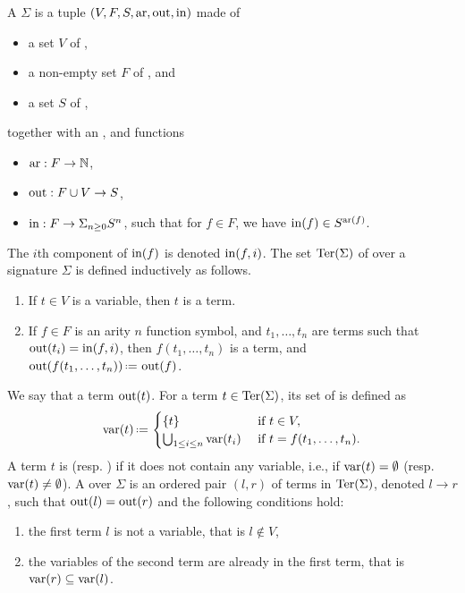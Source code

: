 A  $\Sigma$ is a tuple $(V,F,S,\mathrm{ar},\operatorname{out},\operatorname{in})$ made of 
\begin{itemize}
  \item a set $V$ of ,
  \item a non-empty set $F$ of , and
  \item a set $S$ of ,
\end{itemize}
together with an ,  and  functions
\begin{itemize}
  \item $\mathrm{ar} : F \to \mathbb{N}$,
  \item $\operatorname{out} : F \cup V \to S$,
  \item $\operatorname{in} : F \to \Sigma_{n \geq 0} S^{n}$, such that for $f \in F$, we have $\operatorname{in}(f) \in S^{\mathrm{ar}(f)}$. 
\end{itemize}
The $i$th component of $\operatorname{in}(f)$ is denoted $\operatorname{in}(f,i)$.
The set $\operatorname{Ter}(\Sigma)$ of  over a signature $\Sigma$ is defined inductively as follows. 
\begin{enumerate}
  \item If $t \in V$ is a variable, then $t$ is a term.
  \item If $f \in F$ is an arity $n$ function symbol, and $t_1,\ldots,t_n$ are terms such that $\operatorname{out}(t_i)=\operatorname{in}(f,i)$, then $f(t_1,\ldots,t_n)$ is a term, and $\outsort(f(t_1,\ldots,t_n))\eqdef \outsort(f)$.
\end{enumerate}
We say that a term   $\operatorname{out}(t)$.
For a term $t \in \operatorname{Ter}(\Sigma)$, its set of  is defined as 
\begin{equation*}
  \var(t) \eqdef  
  \begin{cases}
    \{t\} & \text{ if } t \in V, \\
    \bigcup_{1 \leq i \leq n}\var(t_i) & \text{ if } t=f(t_1,\ldots,t_n).
  \end{cases}
\end{equation*}
A term $t$ is  (resp.  ) if it does not contain any variable, i.e., if $\operatorname{var}(t)=\emptyset$ (resp. $\operatorname{var}(t)\neq\emptyset$).
A  over $\Sigma$ is an ordered pair $(l,r)$ of terms in $\operatorname{Ter}(\Sigma)$, denoted $l \to r$, such that
$\operatorname{out}(l)=\operatorname{out}(r)$ and  the following conditions hold:
\begin{enumerate}
  \item the first term $l$ is not a variable, that is $l \notin V$,
  \item the variables of the second term are already in the first term, that is $\operatorname{var}(r) \subseteq \operatorname{var}(l)$.
\end{enumerate}

